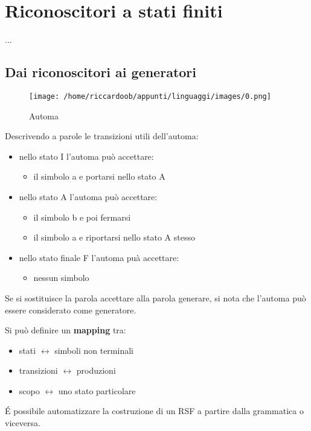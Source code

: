 \chapter{Riconoscitori a stati finiti}
...
\section{Dai riconoscitori ai generatori}
\begin{figure}[H]
    \caption{Automa}
    \centering
    \texttt{[image: /home/riccardoob/appunti/linguaggi/images/0.png]}
\end{figure}

Descrivendo a parole le transizioni utili dell'automa:
\begin{itemize}
    \item nello stato I l'automa può accettare:
    \begin{itemize}
        \item il simbolo a e portarsi nello stato A
    \end{itemize}
    \item nello stato A l'automa può accettare:
    \begin{itemize}
        \item il simbolo b e poi fermarsi
        \item il simbolo a e riportarsi nello stato A stesso
    \end{itemize}
    \item nello stato finale F l'automa puà accettare:
    \begin{itemize}
        \item nessun simbolo
    \end{itemize}
\end{itemize}

Se si sostituisce la parola accettare alla parola generare, si nota che l'automa può essere considerato come generatore.

Si può definire un \textbf{mapping} tra:
\begin{itemize}
    \item stati $\longleftrightarrow$ simboli non terminali
    \item transizioni $\longleftrightarrow$ produzioni
    \item scopo $\longleftrightarrow$ uno stato particolare
\end{itemize}

É possibile automatizzare la costruzione di un RSF a partire dalla grammatica o viceversa.

